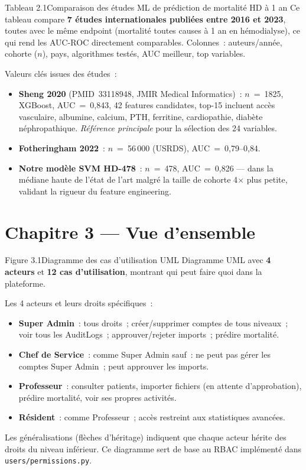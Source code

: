 \documentclass[12pt,a4paper]{article}
\begin{document}
\begin{figbox}{Tableau 2.1}{Comparaison des études ML de prédiction de mortalité HD à 1 an}
Ce tableau compare \textbf{7 études internationales publiées entre 2016 et 2023},
toutes avec le même endpoint (mortalité toutes causes à 1 an en hémodialyse),
ce qui rend les AUC-ROC directement comparables. Colonnes~: auteurs/année,
cohorte ($n$), pays, algorithmes testés, AUC meilleur, top variables.

Valeurs clés issues des études~:
\begin{itemize}[leftmargin=1.5em, itemsep=2pt]
  \item \textbf{Sheng 2020} (PMID~33118948, JMIR Medical Informatics)~:
    $n$~=~1825, XGBoost, AUC~=~0{,}843, 42 features candidates, top-15 incluent
    accès vasculaire, albumine, calcium, PTH, ferritine, cardiopathie, diabète
    néphropathique. \textit{Référence principale} pour la sélection des 24 variables.
  \item \textbf{Fotheringham 2022}~: $n$~=~56\,000 (USRDS), AUC~=~0{,}79--0{,}84.
  \item \textbf{Notre modèle SVM HD-478}~: $n$~=~478, AUC~=~0{,}826 --- dans la
    médiane haute de l'état de l'art malgré la taille de cohorte 4$\times$ plus
    petite, validant la rigueur du feature engineering.
\end{itemize}
\end{figbox}

\section{Chapitre 3 --- Vue d'ensemble}

\begin{figbox}{Figure 3.1}{Diagramme des cas d'utilisation UML}
Diagramme UML avec \textbf{4 acteurs} et \textbf{12 cas d'utilisation}, montrant
qui peut faire quoi dans la plateforme.

Les 4 acteurs et leurs droits spécifiques~:
\begin{itemize}[leftmargin=1.5em, itemsep=2pt]
  \item \textbf{Super Admin}~: tous droits~; créer/supprimer comptes de tous niveaux~;
    voir tous les AuditLogs~; approuver/rejeter imports~; prédire mortalité.
  \item \textbf{Chef de Service}~: comme Super Admin sauf~: ne peut pas gérer
    les comptes Super Admin~; peut approuver les imports.
  \item \textbf{Professeur}~: consulter patients, importer fichiers (en attente
    d'approbation), prédire mortalité, voir ses propres activités.
  \item \textbf{Résident}~: comme Professeur~; accès restreint aux statistiques
    avancées.
\end{itemize}
Les généralisations (flèches d'héritage) indiquent que chaque acteur hérite des
droits du niveau inférieur. Ce diagramme sert de base au RBAC implémenté dans
\texttt{users/permissions.py}.
\end{figbox}
\end{document}
